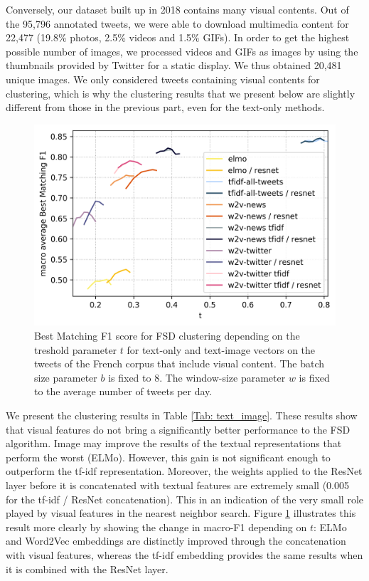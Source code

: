 Conversely, our dataset built up in 2018 contains many visual contents. Out of the 95,796 annotated tweets, we were able to download multimedia content for 22,477 (19.8\% photos, 2.5\% videos and 1.5\% GIFs). In order to get the highest possible number of images, we processed videos and GIFs as images by using the thumbnails provided by Twitter for a static display.  We thus obtained 20,481 unique images. We only considered tweets containing visual contents for clustering, which is why the clustering results that we present below are slightly different from those in the previous part, even for the text-only methods.


\begin{figure}[ht]
  \centering
  \includegraphics[width=.7\linewidth]{figures/text_image_clustering.png}
  \caption{Best Matching F1 score for FSD clustering depending on the treshold parameter $t$ for text-only and text-image vectors on the tweets of the French corpus that include visual content. The batch size parameter $b$ is fixed to 8. The window-size parameter $w$ is fixed to the average number of tweets per day.}
  \label{Fig:text-image}
\end{figure}


We present the clustering results in Table \ref{Tab: text_image}. These results show that visual features do not bring a significantly better performance to the FSD algorithm. Image may improve the results of the textual representations that perform the worst (ELMo). However, this gain is not significant enough to outperform the tf-idf representation. Moreover, the weights applied to the ResNet layer before it is concatenated with textual features are extremely small (0.005 for the tf-idf / ResNet concatenation). This in an indication of the very small role played by visual features in the nearest neighbor search. Figure \ref{Fig:text-image} illustrates this result more clearly by showing the change in macro-F1 depending on $t$: ELMo and Word2Vec embeddings are distinctly improved through the concatenation with visual features, whereas the tf-idf embedding provides the same results when it is combined with the ResNet layer.

